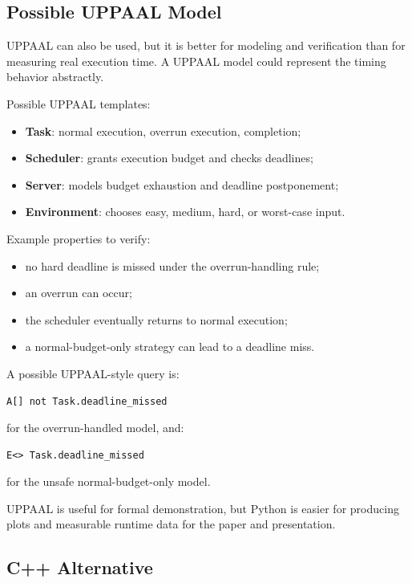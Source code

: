 \documentclass[conference]{IEEEtran}
\begin{document}
\subsection{Possible UPPAAL Model}

UPPAAL can also be used, but it is better for modeling and verification than for measuring real execution time. A UPPAAL model could represent the timing behavior abstractly.

Possible UPPAAL templates:

\begin{itemize}
    \item \textbf{Task}: normal execution, overrun execution, completion;
    \item \textbf{Scheduler}: grants execution budget and checks deadlines;
    \item \textbf{Server}: models budget exhaustion and deadline postponement;
    \item \textbf{Environment}: chooses easy, medium, hard, or worst-case input.
\end{itemize}

Example properties to verify:

\begin{itemize}
    \item no hard deadline is missed under the overrun-handling rule;
    \item an overrun can occur;
    \item the scheduler eventually returns to normal execution;
    \item a normal-budget-only strategy can lead to a deadline miss.
\end{itemize}

A possible UPPAAL-style query is:

\begin{lstlisting}
A[] not Task.deadline_missed
\end{lstlisting}

for the overrun-handled model, and:

\begin{lstlisting}
E<> Task.deadline_missed
\end{lstlisting}

for the unsafe normal-budget-only model.

UPPAAL is useful for formal demonstration, but Python is easier for producing plots and measurable runtime data for the paper and presentation.

\subsection{C++ Alternative}
\end{document}

